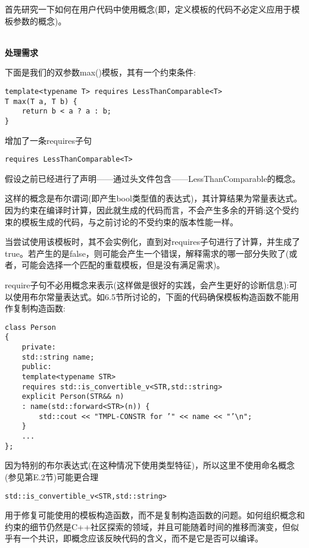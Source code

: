
首先研究一下如何在用户代码中使用概念(即，定义模板的代码不必定义应用于模板参数的概念)。

\hspace*{\fill} \\ %
\noindent
\textbf{处理需求}

下面是我们的双参数max()模板，其有一个约束条件:

\begin{lstlisting}[style=styleCXX]
template<typename T> requires LessThanComparable<T>
T max(T a, T b) {
	return b < a ? a : b;
}
\end{lstlisting}

增加了一条requires子句

\begin{lstlisting}[style=styleCXX]
requires LessThanComparable<T>
\end{lstlisting}

假设之前已经进行了声明——通过头文件包含——LessThanComparable的概念。

这样的概念是布尔谓词(即产生bool类型值的表达式)，其计算结果为常量表达式。因为约束在编译时计算，因此就生成的代码而言，不会产生多余的开销:这个受约束的模板生成的代码，与之前讨论的不受约束的版本性能一样。

当尝试使用该模板时，其不会实例化，直到对requires子句进行了计算，并生成了true。若产生的是false，则可能会产生一个错误，解释需求的哪一部分失败了(或者，可能会选择一个匹配的重载模板，但是没有满足需求)。

require子句不必用概念来表示(这样做是很好的实践，会产生更好的诊断信息):可以使用布尔常量表达式。如6.5节所讨论的，下面的代码确保模板构造函数不能用作复制构造函数:

\begin{lstlisting}[style=styleCXX]
class Person
{
	private:
	std::string name;
	public:
	template<typename STR>
	requires std::is_convertible_v<STR,std::string>
	explicit Person(STR&& n)
	: name(std::forward<STR>(n)) {
		std::cout << "TMPL-CONSTR for ’" << name << "’\n";
	}
	...
};
\end{lstlisting}

因为特别的布尔表达式(在这种情况下使用类型特征)，所以这里不使用命名概念(参见第E.2节)可能更合理

\begin{lstlisting}[style=styleCXX]
std::is_convertible_v<STR,std::string>
\end{lstlisting}

用于修复可能使用的模板构造函数，而不是复制构造函数的问题。如何组织概念和约束的细节仍然是C++社区探索的领域，并且可能随着时间的推移而演变，但似乎有一个共识，即概念应该反映代码的含义，而不是它是否可以编译。

